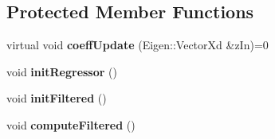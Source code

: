 \subsection*{Protected Member Functions}
\begin{DoxyCompactItemize}
\item 
\mbox{\label{class_r_c_a_c_a5ac60fc4b359cf5555427bd1652d6ca1}} 
virtual void {\bfseries coeff\+Update} (Eigen\+::\+Vector\+Xd \&z\+In)=0
\item 
\mbox{\label{class_r_c_a_c_a8dd38159eccbe85cbee4118020c90c88}} 
void {\bfseries init\+Regressor} ()
\item 
\mbox{\label{class_r_c_a_c_aac17e469acf0f2457941d18ae02bfe07}} 
void {\bfseries init\+Filtered} ()
\item 
\mbox{\label{class_r_c_a_c_a5e6bc7050ced3b1be7d9060d089dccfb}} 
void {\bfseries compute\+Filtered} ()
\end{DoxyCompactItemize}

